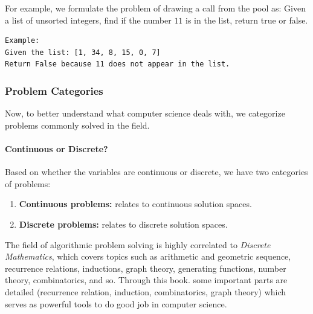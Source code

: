 \documentclass[../main.tex]{subfiles}
\begin{document}
For example, we formulate the problem of drawing a call from the pool as: Given a list of unsorted integers, find if the number $11$ is in the list, return true or false.
\begin{lstlisting}[numbers=none]
Example: 
Given the list: [1, 34, 8, 15, 0, 7]
Return False because 11 does not appear in the list.
\end{lstlisting}


\subsubsection{Problem Categories} Now, to better understand what computer science deals with, we categorize problems commonly solved in the field. 

\paragraph{Continuous or Discrete?}
Based on whether the variables are continuous or discrete, we have two categories of problems:
\begin{enumerate}
    \item \textbf{Continuous problems:} relates to continuous solution spaces.
    \item \textbf{Discrete problems:} relates to discrete solution spaces. 
\end{enumerate}
The field of algorithmic problem solving is highly correlated to \textit{Discrete Mathematics}, which covers topics such as arithmetic and geometric sequence, recurrence relations, inductions, graph theory, generating functions, number theory, combinatorics, and so. Through this book. some important parts are detailed (recurrence relation, induction, combinatorics, graph theory) which serves as powerful tools to do good job in computer science.  
\end{document}
